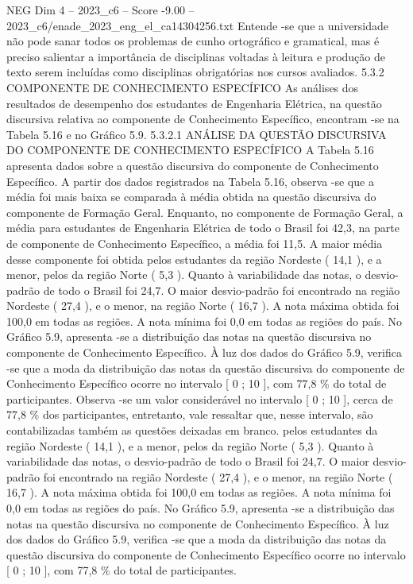 \begin{textsample}{NEG Dim 4 – 2023\_c6 – Score -9.00 – 2023\_c6/enade\_2023\_eng\_el\_ca14304256.txt}
Entende -se que a universidade não pode sanar todos os problemas de cunho ortográfico e gramatical, mas é preciso salientar a importância de disciplinas voltadas à leitura e produção de texto serem incluídas como disciplinas obrigatórias nos cursos avaliados. 5.3.2 COMPONENTE DE CONHECIMENTO ESPECÍFICO As análises dos resultados de desempenho dos estudantes de Engenharia Elétrica, na questão discursiva relativa ao componente de Conhecimento Específico, encontram -se na Tabela 5.16 e no Gráfico 5.9. 5.3.2.1 ANÁLISE DA QUESTÃO DISCURSIVA DO COMPONENTE DE CONHECIMENTO ESPECÍFICO A Tabela 5.16 apresenta dados sobre a questão discursiva do componente de Conhecimento Específico.
A partir dos dados registrados na Tabela 5.16, observa -se que a média foi mais baixa se comparada à média obtida na questão discursiva do componente de Formação Geral.
Enquanto, no componente de Formação Geral, a média para estudantes de Engenharia Elétrica de todo o Brasil foi 42,3, na parte de componente de Conhecimento Específico, a média foi 11,5.
A maior média desse componente foi obtida pelos estudantes da região Nordeste ( 14,1 ), e a menor, pelos da região Norte ( 5,3 ).
Quanto à variabilidade das notas, o desvio-padrão de todo o Brasil foi 24,7.
O maior desvio-padrão foi encontrado na região Nordeste ( 27,4 ), e o menor, na região Norte ( 16,7 ).
A nota máxima obtida foi 100,0 em todas as regiões.
A nota mínima foi 0,0 em todas as regiões do país.
No Gráfico 5.9, apresenta -se a distribuição das notas na questão discursiva no componente de Conhecimento Específico.
À luz dos dados do Gráfico 5.9, verifica -se que a moda da distribuição das notas da questão discursiva do componente de Conhecimento Específico ocorre no intervalo [ 0 ; 10 ], com 77,8 \% do total de participantes.
Observa -se um valor considerável no intervalo [ 0 ; 10 ], cerca de 77,8 \% dos participantes, entretanto, vale ressaltar que, nesse intervalo, são contabilizadas também as questões deixadas em branco. pelos estudantes da região Nordeste ( 14,1 ), e a menor, pelos da região Norte ( 5,3 ).
Quanto à variabilidade das notas, o desvio-padrão de todo o Brasil foi 24,7.
O maior desvio-padrão foi encontrado na região Nordeste ( 27,4 ), e o menor, na região Norte ( 16,7 ).
A nota máxima obtida foi 100,0 em todas as regiões.
A nota mínima foi 0,0 em todas as regiões do país.
No Gráfico 5.9, apresenta -se a distribuição das notas na questão discursiva no componente de Conhecimento Específico.
À luz dos dados do Gráfico 5.9, verifica -se que a moda da distribuição das notas da questão discursiva do componente de Conhecimento Específico ocorre no intervalo [ 0 ; 10 ], com 77,8 \% do total de participantes.

\end{textsample}
